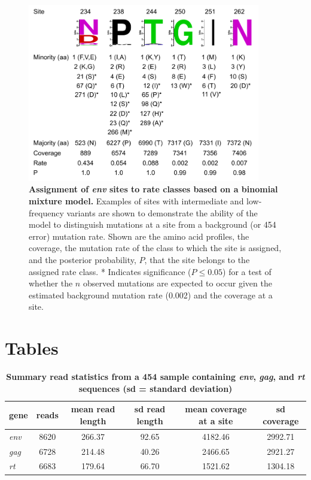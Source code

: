 \documentclass[10pt]{article}
\begin{document}
\begin{figure}[!ht]
\begin{center}
\includegraphics[width=4in]{figures/siterates.pdf}
\end{center}
\caption{
{\bf Assignment of \textit{env} sites to rate classes based on a binomial mixture model.}
Examples of sites with intermediate and low-frequency variants
are shown to demonstrate the ability of the model to distinguish mutations at a site
from a background (or 454 error) mutation rate.
Shown are the amino acid profiles, the coverage,
the mutation rate of the class to which the site is assigned,
and the posterior probability, $P$, that the site belongs to the assigned rate class.
* Indicates significance ($P \leq 0.05$) for a test of whether the $n$ observed mutations are expected to occur
given the estimated background mutation rate (0.002) and the coverage at a site.
}
\label{Figure_label}
\end{figure}

\section*{Tables}
\begin{table}[!ht]
\caption{
\bf{Summary read statistics from a 454 sample containing \textit{env}, \textit{gag}, and \textit{rt} sequences (sd = standard deviation)}}
\begin{tabular}{lccccc}
gene & reads & mean read length & sd read length & mean coverage at a site & sd coverage\\
\hline
\textit{env} & 8620 & 266.37 & 92.65 & 4182.46 & 2992.71 \\
\textit{gag} & 6728 & 214.48 & 40.26 & 2466.65 & 2921.27 \\
\textit{rt}  & 6683 & 179.64 & 66.70 & 1521.62 & 1304.18 \\
\hline
\end{tabular}
\begin{flushleft}
\end{flushleft}
\label{table:summarystats}
\end{table}
\end{document}
